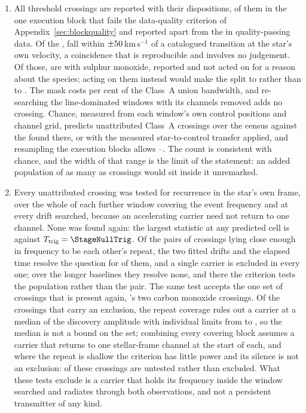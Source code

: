 \begin{enumerate}[leftmargin=1.6em,itemsep=4pt,topsep=4pt,parsep=0pt]
\item All \EvNCrossRaw{} threshold crossings are reported with their
dispositions, \PrFlagXrossWord{} of them in the one execution block that
fails the data-quality criterion of Appendix~\ref{sec:blockquality} and
reported apart from the \EvNCrossQp{} in quality-passing data. Of the
\EvNCrossRaw, \MkNCoinc{} fall within $\pm50$\,km\,s$^{-1}$ of a
catalogued transition at the star's own velocity, a coincidence that is
reproducible and involves no judgement. Of those, \MkNSODecideWord{} are
with sulphur monoxide, reported and not acted on for a reason about the
species; acting on them instead would make the split \MkAttrAlt{} to
\MkUnattrAlt{} rather than \MkAttr{} to \MkUnattr. The mask costs
\MkMaskAPct{} per cent of the Class~A union bandwidth, and re-searching the
line-dominated windows with its channels removed adds no crossing. Chance,
measured from each window's own control positions and channel grid, predicts
\CeExp{} unattributed Class~A crossings over the census against the \CeObs{}
found there, or \CeExpX{} with the measured star-to-control transfer applied,
and resampling the execution blocks allows \CeLo--\CeHi. The count is
consistent with chance, and the width of that range is the limit of the
statement: an added population of as many as \CeAddBlind{} crossings would
sit inside it unremarked.

\item Every unattributed crossing was tested for recurrence in the star's
own frame, over the whole of each further window covering the event frequency
and at every drift searched, because an accelerating carrier need not return
to one channel. None was found
again: the largest statistic at any predicted cell is \RcTMax{}
against $T_{\rm trig}=\StageNullTrig$. Of the \TjNPair{} pairs of crossings
lying close enough in frequency to be each other's repeat, the two fitted
drifts and the elapsed time resolve the question for \TjNPower{} of them, and
a single carrier is excluded in every one; over the longer baselines they
resolve none, and there the criterion tests the population rather than the
pair. The same test
accepts the one set of crossings that is present again, \TjCtlStar's two
carbon monoxide crossings. Of the \RcNExcl{} crossings
that carry an exclusion, the repeat coverage rules out a carrier at a median
\RcFracMed{} of the discovery amplitude with individual limits from
\RcFracMin{} to \RcFracMax, so the median is not a bound on the set;
combining every covering block assumes a carrier that returns to one
stellar-frame channel at the start of each, and where the repeat is shallow
the criterion has little power and its silence is not an exclusion:
\RcNPowerLo{} of these crossings are untested rather than excluded. What
these tests exclude is a carrier that holds its frequency inside the window
searched and radiates through both observations, and not a persistent
transmitter of any kind.


\end{enumerate}
